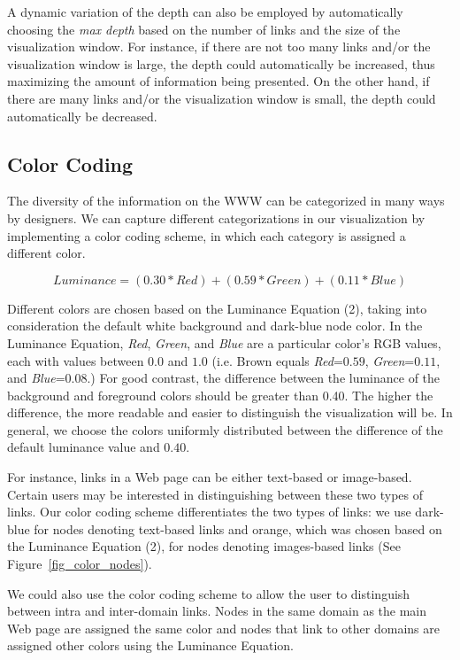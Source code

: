 \documentclass[]{article}
\begin{document}
{A dynamic variation of the depth can also be employed by automatically choosing the {\em max depth} based on the number of links and the size of the visualization window.
For instance, if there are not too many links and/or the visualization window is large, the depth could automatically be increased, thus maximizing the amount of information being presented.
On the other hand, if there are many links and/or the visualization window is small, the depth could automatically be decreased.

\subsection{Color Coding}
\label{ss:color_coding}

The diversity of the information on the WWW can be categorized in many ways by designers.
We can capture different categorizations in our visualization by implementing a color coding scheme, in which each category is assigned a different color.

\begin{equation}
 Luminance = (0.30*Red) + (0.59*Green) + (0.11*Blue)
\end{equation}
\label{lum_eq}

Different colors are chosen based on the Luminance Equation (2), taking into consideration the default white background and dark-blue node color.
In the Luminance Equation, {\em Red}, {\em Green}, and {\em Blue} are a particular color's RGB values, each with values between $0.0$ and $1.0$ (i.e. Brown equals {\em Red}=$0.59$, {\em Green}=$0.11$, and {\em Blue}=$0.08$.)
For good contrast, the difference between the luminance of the background and foreground colors should be greater than 0.40.
The higher the difference, the more readable and easier to distinguish the visualization will be.
In general, we choose the colors uniformly distributed between the difference of the default luminance value and $0.40$.

For instance, links in a Web page can be either text-based or image-based.
Certain users may be interested in distinguishing between these two types of links.
Our color coding scheme differentiates the two types of links: we use dark-blue for nodes denoting text-based links and orange, which was chosen based on the Luminance Equation (2), for nodes denoting images-based links (See Figure~\ref{fig_color_nodes}).

We could also use the color coding scheme to allow the user to distinguish between intra and inter-domain links.
Nodes in the same domain as the main Web page are assigned the same color and nodes that link to other domains are assigned other colors using the Luminance Equation.

}
\end{document}
